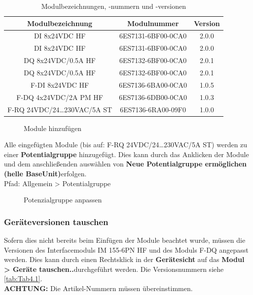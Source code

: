 \begin{table}[H]
    \centering
    \begin{tabular}{|c|c|c|}
        \hline
         \textbf{Modulbezeichnung} & \textbf{Modulnummer} & \textbf{Version} \\
         \hline
         DI 8x24VDC HF	& 6ES7131-6BF00-0CA0	& 2.0.0 \\
         \hline
         DI 8x24VDC HF	& 6ES7131-6BF00-0CA0	& 2.0.0 \\
         \hline
         DQ 8x24VDC/0.5A HF &	6ES7132-6BF00-0CA0	& 2.0.1 \\
         \hline
         DQ 8x24VDC/0.5A HF &	6ES7132-6BF00-0CA0	& 2.0.1 \\
         \hline
         F-DI 8x24VDC HF & 	6ES7136-6BA00-0CA0	& 1.0.5 \\
         \hline
         F-DQ 4x24VDC/2A PM HF & 	6ES7136-6DB00-0CA0	& 1.0.3 \\
         \hline
         F-RQ 24VDC/24…230VAC/5A ST & 	6ES7136-6RA00-09F0	& 1.0.0 \\
         \hline
    \end{tabular}
    \caption{Modulbezeichnungen, -nummern und -versionen}
    \label{tab:Tab4.1}
\end{table}

\begin{figure}[H]
   \centering
   \caption[Module hinzufügen]{Module hinzufügen}
   \label{fig:Bild4.4}
\end{figure}

Alle eingefügten Module (bis auf: F-RQ 24VDC/24…230VAC/5A ST) werden zu einer \textbf{Potentialgruppe} hinzugefügt. Dies kann durch das Anklicken der Module und dem anschließenden auswählen von \glqq\textbf{Neue Potentialgruppe ermöglichen (helle BaseUnit)}\grqq\:erfolgen.\\
Pfad: Allgemein > Potentialgruppe

\begin{figure}[H]
   \centering
   \caption[Potenzialgruppe anpassen]{Potenzialgruppe anpassen}
   \label{fig:Bild4.5}
\end{figure}

\subsubsection{Geräteversionen tauschen}
Sofern dies nicht bereits beim Einfügen der Module beachtet wurde, müssen die Versionen des Interfacemoduls IM 155-6PN HF und des Moduls F-DQ angepasst werden. Dies kann durch einen Rechtsklick in der \textbf{Gerätesicht} auf das \glqq\textbf{Modul > Geräte tauschen..}\grqq\:durchgeführt werden. Die Versionsnummern siehe \autoref{tab:Tab4.1}. \\
\textbf{ACHTUNG:} Die Artikel-Nummern müssen übereinstimmen.

